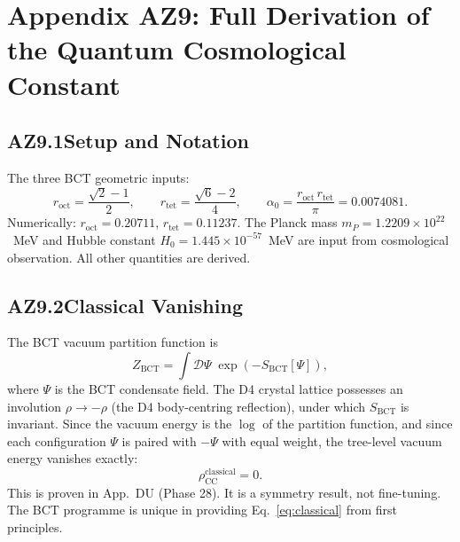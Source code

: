 \documentclass[aps,prl,twocolumn,showpacs,preprintnumbers]{revtex4-2}
\newcommand{\roct}{r_{\mathrm{oct}}}
\newcommand{\rtet}{r_{\mathrm{tet}}}
\newcommand{\azero}{\alpha_0}
\newcommand{\mP}{m_P}
\newcommand{\rhoCC}{\rho_{\mathrm{CC}}}
\newcommand{\Hzero}{H_0}
\begin{document}
\clearpage
\appendix

\section*{Appendix AZ9: Full Derivation of the Quantum Cosmological Constant}

\setcounter{equation}{0}
\renewcommand{\theequation}{AZ9.\arabic{equation}}
\renewcommand{\thetable}{AZ9.\arabic{table}}

\subsection*{AZ9.1\quad Setup and Notation}

The three BCT geometric inputs:
\begin{equation}
  \roct = \frac{\sqrt{2}-1}{2},
  \qquad
  \rtet = \frac{\sqrt{6}-2}{4},
  \qquad
  \azero = \frac{\roct\,\rtet}{\pi} = 0.0074081.
\end{equation}
Numerically: $\roct = 0.20711$, $\rtet = 0.11237$.
The Planck mass $\mP = 1.2209\times10^{22}$~MeV and Hubble constant
$\Hzero = 1.445\times10^{-57}$~MeV are input from cosmological observation.
All other quantities are derived.

\subsection*{AZ9.2\quad Classical Vanishing}

The BCT vacuum partition function is
\begin{equation}
  Z_{\mathrm{BCT}} = \int \mathcal{D}\Psi\;\exp\!\left(-S_{\mathrm{BCT}}[\Psi]\right),
\end{equation}
where $\Psi$ is the BCT condensate field. The D4 crystal lattice possesses
an involution $\rho \to -\rho$ (the D4 body-centring reflection), under
which $S_{\mathrm{BCT}}$ is invariant. Since the vacuum energy is the
$\log$ of the partition function, and since each configuration $\Psi$ is
paired with $-\Psi$ with equal weight, the tree-level vacuum energy vanishes
exactly:
\begin{equation}
  \rhoCC^{\mathrm{classical}} = 0.
  \label{eq:classical}
\end{equation}
This is proven in App.~DU (Phase 28). It is a symmetry result, not fine-tuning.
The BCT programme is unique in providing Eq.~\eqref{eq:classical} from first
principles.
\end{document}
